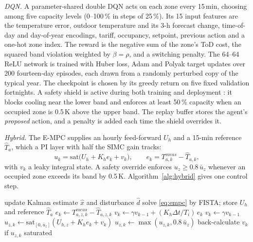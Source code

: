 \emph{DQN.} A parameter-shared double DQN \cite{mnih2015,vanhasselt2016} acts on each
zone every 15\,min, choosing among five capacity levels (0--100\,\% in steps of
25\,\%). Its 15 input features are the temperature error, outdoor temperature and its
3-h forecast change, time-of-day and day-of-year encodings, tariff, occupancy, setpoint,
previous action and a one-hot zone index. The reward is the negative sum of the zone's
ToD cost, the squared band violation weighted by $\beta=\rho$, and a switching penalty.
The 64--64 ReLU network is trained with Huber loss, Adam and Polyak target updates over
200 fourteen-day episodes, each drawn from a randomly perturbed copy of the typical year.
The checkpoint is chosen by its greedy return on five fixed validation fortnights. A
safety shield is active during both training and deployment \cite{alshiekh2018}: it
blocks cooling near the lower band and enforces at least 50\,\% capacity when an
occupied zone is 0.5\,K above the upper band. The replay buffer stores the agent's
\emph{proposed} action, and a penalty is added each time the shield overrides it.

\emph{Hybrid.} The E-MPC supplies an hourly feed-forward $U_h$ and a 15-min reference
$\hat T_a$, which a PI layer with half the SIMC gain tracks:
\begin{equation}
u_k=\mathrm{sat}\big(U_h+K_he_k+v_k\big),\qquad e_k=T^{meas}_{a,k}-\hat T_{a,k},
\label{eq:hyb}
\end{equation}
with $v_k$ a leaky integral state. A safety override enforces $u_z\ge0.8\,\bar u_z$
whenever an occupied zone exceeds its band by 0.5\,K. Algorithm~\ref{alg:hybrid} gives
one control step.

\begin{algorithm}[t]
\caption{Hybrid controller, one 15-min step for zone $z$}\label{alg:hybrid}
\begin{algorithmic}[1]
  \STATE update Kalman estimate $\hat x$ and disturbance $\hat d$
  \STATE solve \eqref{eq:empc} by FISTA; store $U_h$ and reference $\hat T_a$
\ENDIF
\STATE $e_k\leftarrow T^{meas}_{a,z,k}-\hat T_{a,z,k}$
  \STATE $v_k\leftarrow \gamma v_{k-1}+(K_h\Delta t/T_i)\,e_k$ 
\ELSE
  \STATE $v_k\leftarrow \gamma v_{k-1}$ 
\ENDIF
\STATE $u_{z,k}\leftarrow\mathrm{sat}_{[0,\bar u_z]}(U_{h,z}+K_he_k+v_k)$
  \STATE $u_{z,k}\leftarrow\max(u_{z,k},0.8\,\bar u_z)$ 
\ENDIF
\STATE back-calculate $v_k$ if $u_{z,k}$ saturated
\end{algorithmic}
\end{algorithm}

